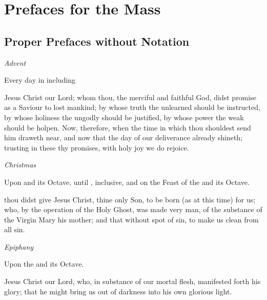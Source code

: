 \fancyhead[RE,LO]{}
\section{Prefaces for the Mass}\label{prefaces}

\subsection{Proper Prefaces without Notation}

\begin{multicols}{2}

\raggedcolumns	

\centerline{\textit{Advent}}%
\begin{rubric}
	Every day in  including 
\end{rubric}
 Jesus Christ our Lord; whom thou, the merciful and faithful God, didst promise as a Saviour to lost mankind; by whose truth the unlearned should be instructed, by whose holiness the ungodly should be justified, by whose power the weak should be holpen. Now, therefore, when the time in which thou shouldest send him draweth near, and now that the day of our deliverance already shineth; trusting in these thy promises, with holy joy we do rejoice.\\

\centerline{\textit{Christmas}}
\begin{rubric}
	Upon  and its Octave, until , inclusive, and on the Feast of the  and its Octave.
\end{rubric}
 thou didst give Jesus Christ, thine only Son, to be born (as at this time) for us; who, by the operation of the Holy Ghost, was made very man, of the substance of the Virgin Mary his mother; and that without spot of sin, to make us clean from all sin.%

\newcolumn

\centerline{\textit{Epiphany}}
\begin{rubric}
	Upon the  and its Octave.
\end{rubric}
 Jesus Christ our Lord, who, in substance of our mortal flesh, manifested forth his glory; that he might bring us out of darkness into his own glorious light.\\


\end{multicols}
